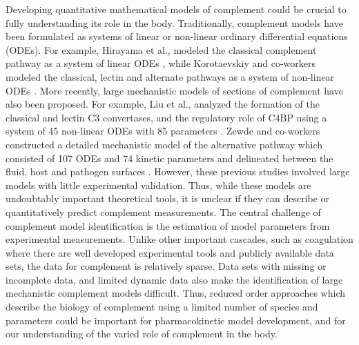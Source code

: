 \documentclass[12pt]{article}
\begin{document}
Developing quantitative mathematical models of complement could be crucial to fully understanding its role in the body.
Traditionally, complement models have been formulated as systems of linear or non-linear ordinary differential equations (ODEs).
For example, Hirayama et al., modeled the classical complement pathway as a system of linear ODEs \cite{hirayama1996linear},
while Korotaevskiy and co-workers modeled the classical, lectin and alternate pathways as a system of non-linear ODEs \cite{korotaevskiy2009non}.
More recently, large mechanistic models of sections of complement have also been proposed.
For example, Liu et al., analyzed the formation of the classical and lectin C3 convertases, and the regulatory role of C4BP using a system of 45 non-linear ODEs with 85 parameters \cite{liu2011computational}.
Zewde and co-workers constructed a detailed mechanistic model of the alternative pathway which consisted of 107 ODEs and 74 kinetic parameters and delineated between
the fluid, host and pathogen surfaces \cite{zewde2016quantitative}.
However, these previous studies involved large models with little experimental validation.
Thus, while these models are undoubtably important theoretical tools, it is unclear if they can describe or quantitatively predict complement measurements.
The central challenge of complement model identification is the estimation of model parameters from experimental measurements.
Unlike other important cascades, such as coagulation where there are well developed experimental tools and publicly available data sets,
the data for complement is relatively sparse. Data sets with missing or incomplete data, and limited dynamic
data also make the identification of large mechanistic complement models difficult.
Thus, reduced order approaches which describe the biology of complement using a limited number of species and parameters
could be important for pharmacokinetic model development, and for our understanding of the varied role of complement in the body.

\end{document}
